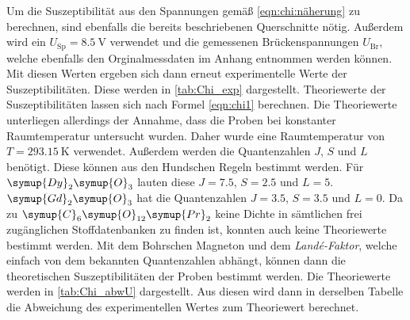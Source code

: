 Um die Suszeptibilität aus den Spannungen gemäß \autoref{eqn:chi:näherung} zu berechnen, sind ebenfalls die bereits beschriebenen Querschnitte nötig. Außerdem wird ein 
$U_{\text{Sp}} = \qty{8.5}{\volt}$ verwendet und die gemessenen Brückenspannungen $U_{\text{Br}}$, welche ebenfalls den Orginalmessdaten im Anhang entnommen werden können.
Mit diesen Werten ergeben sich dann erneut experimentelle Werte der Suszeptibilitäten. Diese werden in \autoref{tab:Chi_exp} dargestellt.
Theoriewerte der Suszeptibilitäten lassen sich nach Formel \eqref{eqn:chi1} berechnen. Die Theoriewerte unterliegen allerdings der Annahme, dass die Proben bei konstanter 
Raumtemperatur untersucht wurden. Daher wurde eine Raumtemperatur von $T = \qty{293.15}{\kelvin}$ verwendet. Außerdem werden die Quantenzahlen $J$, $S$ und $L$ benötigt. Diese
können aus den Hundschen Regeln bestimmt werden. Für $\symup{Dy}_2\symup{O}_3$ lauten diese $J = 7.5$, $S = 2.5$ und $L = 5$. $\symup{Gd}_2\symup{O}_3$ hat die Quantenzahlen
$J = 3.5$, $S = 3.5$ und $L = 0$. Da zu $\symup{C}_6\symup{O}_{12}\symup{Pr}_2$ keine Dichte in sämtlichen frei zugänglichen Stoffdatenbanken zu finden ist, 
konnten auch keine Theoriewerte bestimmt werden.
Mit dem Bohrschen Magneton und dem \textit{Landé-Faktor}, welche einfach von dem bekannten Quantenzahlen abhängt, können dann die theoretischen Suszeptibilitäten der Proben
bestimmt werden. Die Theoriewerte werden in \autoref{tab:Chi_abwU} dargestellt. Aus diesen wird dann in derselben Tabelle die Abweichung des experimentellen
Wertes zum Theoriewert berechnet. 

